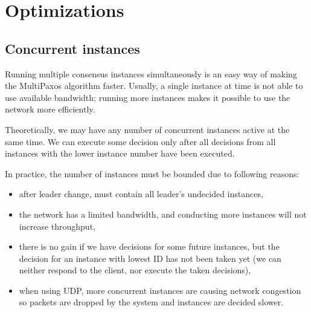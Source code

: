 \chapter{Optimizations}

\section{Concurrent instances}
\label{subsec:concurrent_instances}
Running multiple consensus instances simultaneously is an easy way of making the MultiPaxos algorithm faster. Usually, a single instance at time is not able to use available bandwidth; running more instances makes it possible to use the network more efficiently.

Theoretically, we may have any number of concurrent instances active at the same time. We can execute some decision only after all decisions from all instances with the lower instance number have been executed.

In practice, the number of instances must be bounded due to following reasons:
\begin{itemize} 
  \item after leader change, \prepareOK must contain all leader's undecided instances,
  \item the network has a limited bandwidth, and conducting more instances will not increase throughput,
  \item there is no gain if we have decisions for some future instances, but the decision for an instance with lowest ID has not been taken yet (we can neither respond to the client, nor execute the taken decisions),
  \item when using UDP, more concurrent instances are causing network congestion so packets are dropped by the system and instances are decided slower.
\end{itemize}


